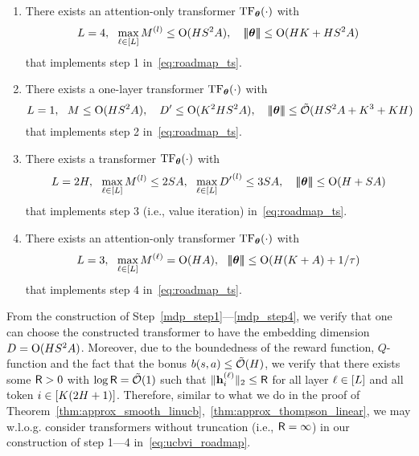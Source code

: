 \begin{enumerate}[label=Step \arabic*,ref= \arabic*]
    \item\label{mdp_step1}There exists an attention-only transformer ${\rm TF}_{\boldsymbol \theta}(\cdot)$ with     $$L=4,~~\max_{\ell\in[L]}M^{(l)}\leq {\mathrm{O}}({H}{S}^2{A}),~~~ {\left|\!\left|\!\left|{{\boldsymbol \theta}}\right|\!\right|\!\right|}\leq {\mathrm{O}}({H}{K}+{H}{S}^2{A}) $$
 that implements step 1 in~\eqref{eq:roadmap_ts}.
   \item \label{mdp_step2}
 There exists a one-layer  transformer ${\rm TF}_{\boldsymbol \theta}(\cdot)$ with 
$$
L=1,~~{M}\leq {\mathrm{O}}({H}{S}^2{A}),~~~ {D'}\leq {\mathrm{O}}({K}^2{H}{S}^2{A}),~~~{\left|\!\left|\!\left|{{\boldsymbol \theta}}\right|\!\right|\!\right|}\leq {\tilde{\mathcal O}}({H}{S}^2{A}+{K}^3+{K}{H})
$$
 that implements step 2 in~\eqref{eq:roadmap_ts}. 
  \item\label{mdp_step3}  There exists a transformer  ${\rm TF}_{{\boldsymbol \theta}}(\cdot)$ with 
    $$L=2{H},~~\max_{\ell\in[L]}M^{(l)}\leq 2{S}{A},~~\max_{\ell\in[L]}{D'}^{(l)}\leq 3{S}{A},~~~ {\left|\!\left|\!\left|{{\boldsymbol \theta}}\right|\!\right|\!\right|}\leq  {\mathrm{O}}({H}+{S}{A}) $$
 that implements step 3 (i.e., value iteration) in~\eqref{eq:roadmap_ts}.
  \item \label{mdp_step4}
 There exists an attention-only transformer ${\rm TF}_{\boldsymbol \theta}(\cdot)$ with 
$${L}=3,~~\max_{\ell\in[{L}]}{M}^{(\ell)}={\mathrm{O}}({H}{A}),~~{\left|\!\left|\!\left|{{\boldsymbol \theta}}\right|\!\right|\!\right|}\leq {\mathrm{O}}({H}({K}+{A})+{1}/{{\tau}}) $$
 that implements step 4 in~\eqref{eq:roadmap_ts}.
\end{enumerate}
From the construction of Step~\ref{mdp_step1}---\ref{mdp_step4}, we verify that one can choose the constructed transformer to have the embedding dimension $D={\mathrm{O}}({H}{S}^2{A})$. Moreover, due to the boundedness of the reward function, $Q$-function  and the fact that the bonus ${b}({s},{a})\leq{\tilde{\mathcal O}}({H})$, we verify that there exists some ${\mathsf{R}}>0$ with $\log {\mathsf{R}}={\tilde{\mathcal O}}(1)$ such that $\|{\mathbf h}_i^{{(\ell)}}\|_2\leq {\mathsf{R}}$ for all layer $\ell\in[{L}]$ and all token $i\in[{K}(2{H}+1)]$. Therefore, similar to what we do in the proof of Theorem~\ref{thm:approx_smooth_linucb},~\ref{thm:approx_thompson_linear}, we may w.l.o.g. consider transformers without truncation (i.e.,  ${\mathsf{R}}=\infty$) in our construction of step 1---4 in~\eqref{eq:ucbvi_roadmap}.




